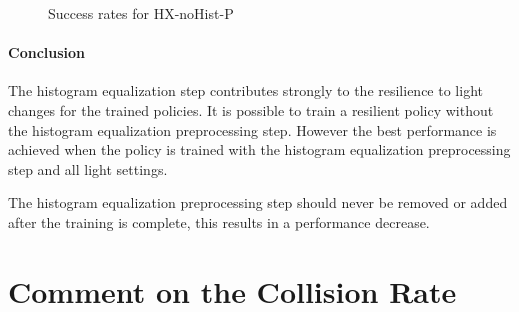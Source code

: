 \begin{figure}
    \centering
    \caption{Success rates for \ac{HX-noHist-P}}
    \label{fig:hardDistance_mixedLight_noHistogramEqualizationTraining_results_withHistogramEqualization}
\end{figure}


\paragraph{Conclusion}
The histogram equalization step contributes strongly to the resilience to light changes for the trained policies. It is possible to train a resilient policy without the histogram equalization preprocessing step.
However the best performance is achieved when the policy is trained with the histogram equalization preprocessing step and all light settings.

The histogram equalization preprocessing step should never be removed or added after the training is complete, this results in a performance decrease.

\section{Comment on the Collision Rate}
\label{sec:comment_on_collision_rate}

